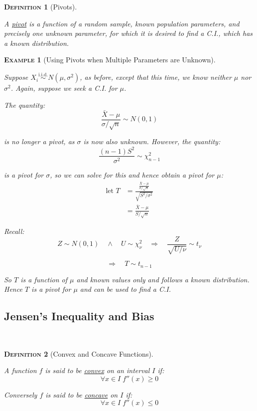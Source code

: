 \documentclass[12pt,a4paper]{article}
\newtheorem{definition}{\textsc{Definition}}[section]
\newtheorem{example}{\textsc{Example}}[section]
\begin{document}
\begin{definition}[Pivots]$\;$\par\vspace{1cm}

A \underline{pivot} is a function of a random sample, known population parameters, and precisely one unknown parameter, for which it is desired to find a C.I., which has a known distribution.

\end{definition}

\begin{example}[Using Pivots when Multiple Parameters are Unknown]$\;$\par\vspace{1cm}

Suppose $X_i \overset{\text{i.i.d.}}{\sim} N(\mu,\sigma^2)$, as before, except that this time, we know neither $\mu$ nor $\sigma^2$. Again, suppose we seek a C.I. for $\mu$.

The quantity:
$$\frac{\bar{X}-\mu}{\sigma/\sqrt{n}} \sim N(0,1)$$

is no longer a pivot, as $\sigma$ is now also unknown. However, the quantity:
$$\frac{(n-1)S^2}{\sigma^2} \sim \chi^2_{n-1}$$

is a pivot for $\sigma$, so we can solve for this and hence obtain a pivot for $\mu$:
\begin{align*}
\text{let } T &= \frac{\frac{\bar{X}-\mu}{\sigma/\sqrt{n}}}{\sqrt{S^2/\sigma^2}}\\
&= \frac{\bar{X}-\mu}{S/\sqrt{n}}
\end{align*}

Recall:
$$Z\sim N(0,1) \quad \wedge\quad U \sim \chi^2_\nu \quad \Rightarrow\quad \frac{Z}{\sqrt{U/\nu}} \sim t_\nu$$

$$\Rightarrow\quad T \sim t_{n-1}$$

So $T$ is a function of $\mu$ and known values only and follows a known distribution. Hence $T$ is a pivot for $\mu$ and can be used to find a C.I.

\end{example}

\subsection{Jensen's Inequality and Bias}$\;$

\begin{definition}[Convex and Concave Functions]$\;$\par\vspace{1cm}

A function $f$ is said to be \underline{convex} on an interval $I$ if:
$$\forall x\in I\;f''(x) \geq 0$$\par\vspace{1cm}

Conversely $f$ is said to be \underline{concave} on $I$ if:
$$\forall x \in I \; f''(x) \leq 0$$\par\vspace{1cm}

\end{definition}
\end{document}

